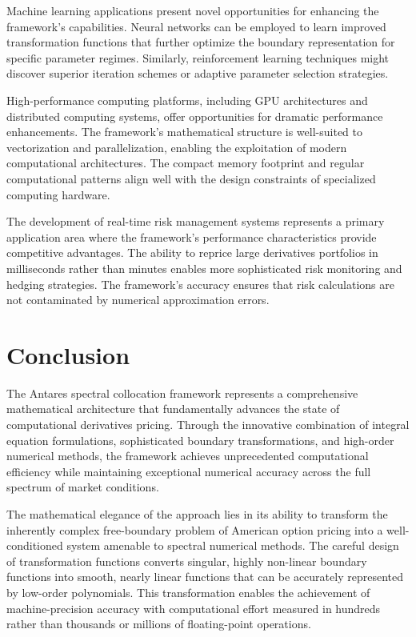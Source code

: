 \documentclass[
  american,
  11pt,
  11pt,
  letterpaper,
  onecolumn]{article}
\begin{document}
Machine learning applications present novel opportunities for enhancing
the framework's capabilities. Neural networks can be employed to learn
improved transformation functions that further optimize the boundary
representation for specific parameter regimes. Similarly, reinforcement
learning techniques might discover superior iteration schemes or
adaptive parameter selection strategies.

High-performance computing platforms, including GPU architectures and
distributed computing systems, offer opportunities for dramatic
performance enhancements. The framework's mathematical structure is
well-suited to vectorization and parallelization, enabling the
exploitation of modern computational architectures. The compact memory
footprint and regular computational patterns align well with the design
constraints of specialized computing hardware.

The development of real-time risk management systems represents a
primary application area where the framework's performance
characteristics provide competitive advantages. The ability to reprice
large derivatives portfolios in milliseconds rather than minutes enables
more sophisticated risk monitoring and hedging strategies. The
framework's accuracy ensures that risk calculations are not contaminated
by numerical approximation errors.

\section{Conclusion}\label{conclusion}

The Antares spectral collocation framework represents a comprehensive
mathematical architecture that fundamentally advances the state of
computational derivatives pricing. Through the innovative combination of
integral equation formulations, sophisticated boundary transformations,
and high-order numerical methods, the framework achieves unprecedented
computational efficiency while maintaining exceptional numerical
accuracy across the full spectrum of market conditions.

The mathematical elegance of the approach lies in its ability to
transform the inherently complex free-boundary problem of American
option pricing into a well-conditioned system amenable to spectral
numerical methods. The careful design of transformation functions
converts singular, highly non-linear boundary functions into smooth,
nearly linear functions that can be accurately represented by low-order
polynomials. This transformation enables the achievement of
machine-precision accuracy with computational effort measured in
hundreds rather than thousands or millions of floating-point operations.
\end{document}
